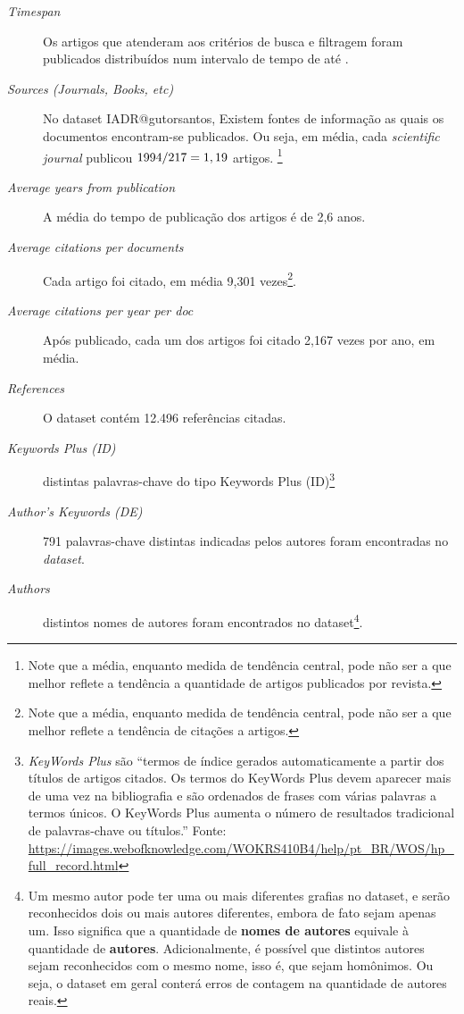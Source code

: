 \begin{description}
    \item [\textit{Timespan}] Os artigos que atenderam aos critérios de busca e filtragem foram publicados distribuídos num intervalo de tempo de \startYearIADRgutorsantos{} até \finalYearIADRgutorsantos{}.
    \item [\textit{Sources (Journals, Books, etc)}] No dataset IADR@gutorsantos, Existem \totalSourceIADRgutorsantos{} fontes de informação as quais os documentos encontram-se publicados. Ou seja, em média, cada \textit{scientific journal} publicou $1994{}/217{}=1,19$ artigos. \footnote{Note que a média, enquanto medida de tendência central, pode não ser a que melhor reflete a tendência a quantidade de artigos publicados por revista.}
    \item [\textit{Average years from publication}] A média do tempo de publicação dos artigos é de 2,6 anos.
    \item [\textit{Average citations per documents}] Cada artigo foi citado, em média 9,301 vezes\footnote{Note que a média, enquanto medida de tendência central, pode não ser a que melhor reflete a tendência de  citações a artigos.}.
    \item [\textit{Average citations per year per doc}] Após publicado, cada um dos \totalDocumentsIADRgutorsantos{} artigos foi citado 2,167 vezes por ano, em média.
    \item [\textit{References}] O dataset contém 12.496 referências citadas.
    \item [\textit{Keywords Plus (ID)}] \totalKWPlusIADRgutorsantos{} distintas palavras-chave do tipo Keywords Plus (ID)\footnote{\textit{KeyWords Plus} são ``termos de índice gerados automaticamente a partir dos títulos de artigos citados. Os termos do KeyWords Plus devem aparecer mais de uma vez na bibliografia e são ordenados de frases com várias palavras a termos únicos. O KeyWords Plus aumenta o número de resultados tradicional de palavras-chave ou títulos.'' Fonte: \url{https://images.webofknowledge.com/WOKRS410B4/help/pt_BR/WOS/hp_full_record.html}}
    \item [\textit{Author's Keywords (DE)}] 791 palavras-chave distintas indicadas pelos autores foram encontradas no \textit{dataset}.
    \item [\textit{Authors}] \totalAuthorsIADRgutorsantos{} distintos nomes de autores foram encontrados no dataset\footnote{Um mesmo autor pode ter uma ou mais diferentes grafias no dataset, e serão reconhecidos dois ou mais autores diferentes, embora de fato sejam apenas um. Isso significa que a quantidade de \textbf{nomes de autores} equivale à quantidade de \textbf{autores}. Adicionalmente, é possível que distintos autores sejam reconhecidos com o mesmo nome, isso é, que sejam homônimos. Ou seja, o dataset em geral conterá erros de contagem na quantidade de autores reais.}.

\end{description}
